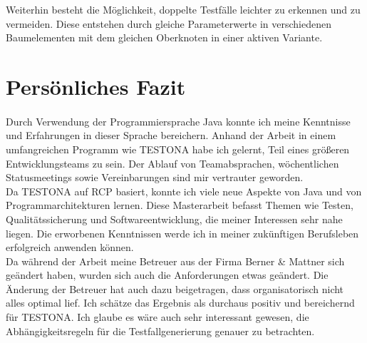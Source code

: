 Weiterhin besteht die Möglichkeit, doppelte Testfälle leichter zu erkennen und zu vermeiden. Diese entstehen durch gleiche Parameterwerte in verschiedenen Baumelementen mit dem gleichen Oberknoten in einer aktiven Variante.\\


\newpage
\section{Persönliches Fazit}
\paragraph{}
Durch Verwendung der Programmiersprache Java konnte ich meine Kenntnisse und Erfahrungen in dieser Sprache bereichern. Anhand der Arbeit in einem umfangreichen Programm wie TESTONA habe ich gelernt, Teil eines größeren Entwicklungsteams zu sein. Der Ablauf von Teamabsprachen, wöchentlichen Statusmeetings sowie Vereinbarungen sind mir vertrauter geworden.\\


Da TESTONA auf RCP basiert, konnte ich viele neue Aspekte von Java und von Programm\-architekturen lernen. Diese Masterarbeit befasst Themen wie Testen, Qualitätssicherung und Softwareentwicklung, die meiner Interessen sehr nahe liegen. Die erworbenen Kenntnissen werde ich in meiner zukünftigen Berufsleben erfolgreich anwenden können.\\


Da während der Arbeit meine Betreuer aus der Firma Berner \& Mattner sich geändert haben, wurden sich auch die Anforderungen etwas geändert. Die Änderung der Betreuer hat auch dazu beigetragen, dass organisatorisch nicht alles optimal lief. Ich schätze das Ergebnis als durchaus positiv und bereichernd für TESTONA. Ich glaube es wäre auch sehr interessant gewesen, die Abhängigkeitsregeln für die Testfallgenerierung genauer zu betrachten.